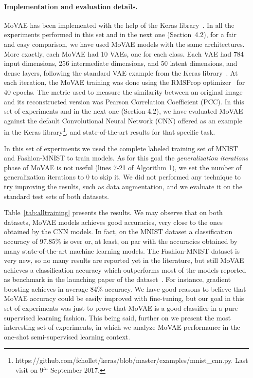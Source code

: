 \documentclass[sigconf,authorversion=true]{aamas}  %
\begin{document}
\paragraph{Implementation and evaluation details.} MoVAE has been implemented with the help of the Keras library~\cite{chollet2015}. In all the experiments performed in this set and in the next one (Section~4.2), for a fair and easy comparison, we have used MoVAE models with the same architectures. More exactly, each MoVAE had 10 VAEs, one for each class. Each VAE had 784 input dimensions, 256 intermediate dimensions, and 50 latent dimensions, and dense layers, following the standard VAE example from the Keras library~\cite{chollet2015}. At each iteration, the MoVAE training was done using the RMSProp optimizer~\cite{rmsproptraining} for 40 epochs. The metric used to measure the similarity between an original image and its reconstructed version was Pearson Correlation Coefficient (PCC). In this set of experiments and in the next one (Section 4.2), we have evaluated MoVAE against the default Convolutional Neural Network (CNN) offered as an example in the Keras library\footnote{https://github.com/fchollet/keras/blob/master/examples/mnist\_cnn.py. Last visit on 9$^{th}$ September 2017.}, and state-of-the-art results for that specific task.

In this set of experiments we used the complete labeled training set of MNIST and Fashion-MNIST to train models. As for this goal the \textit{generalization iterations} phase of MoVAE is not useful (lines 7-21 of Algorithm 1), we set the number of generalization iterations to 0 to skip it. We did not performed any technique to try improving the results, such as data augmentation, and we evaluate it on the standard test sets of both datasets.

Table~\ref{tab:alltraining} presents the results. We may observe that on both datasets, MoVAE models achieves good accuracies, very close to the ones obtained by the CNN models. In fact, on the MNIST dataset a classification accuracy of 97.85\% is over or, at least, on par with the accuracies obtained by many state-of-the-art machine learning models. The Fashion-MNIST dataset is very new, so no many results are reported yet in the literature, but still MoVAE achieves a classification accuracy which outperforms most of the models reported as benchmark in the launching paper of the dataset~\cite{xiao2017FashionMNIST}. For instance, gradient boosting achieves in average 84\% accuracy. We have good reasons to believe that MoVAE accuracy could be easily improved with fine-tuning, but our goal in this set of experiments was just to prove that MoVAE is a good classifier in a pure supervised learning fashion. This being said, further on we present the most interesting set of experiments, in which we analyze MoVAE performance in the one-shot semi-supervised learning context.
\end{document}
